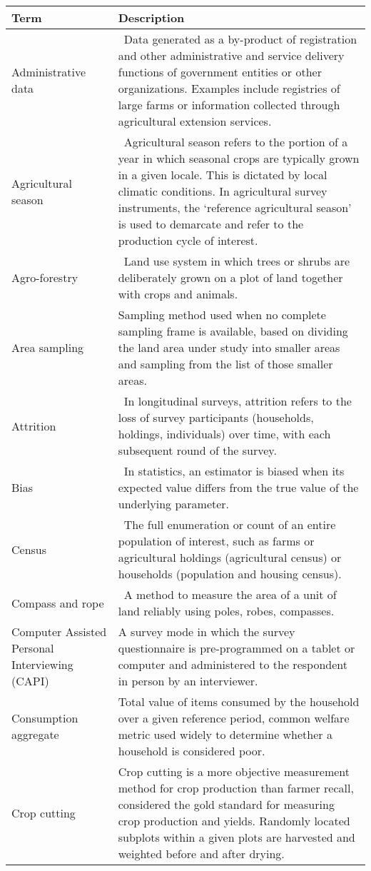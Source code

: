 \documentclass[
]{book}
\begin{document}
\begin{longtable}[]{@{}ll@{}}
\toprule
\textbf{Term} & \textbf{Description} \\
\midrule
\endhead
Administrative data & ~Data generated as a by-product of registration and other administrative and service delivery functions of government entities or other organizations. Examples include registries of large farms or information collected through agricultural extension services. \\
Agricultural season & ~Agricultural season refers to the portion of a year in which seasonal crops are typically grown in a given locale. This is dictated by local climatic conditions. In agricultural survey instruments, the `reference agricultural season' is used to demarcate and refer to the production cycle of interest. \\
Agro-forestry & ~Land use system in which trees or shrubs are deliberately grown on a plot of land together with crops and animals. \\
Area sampling & Sampling method used when no complete sampling frame is available, based on dividing the land area under study into smaller areas and sampling from the list of those smaller areas. \\
Attrition & ~In longitudinal surveys, attrition refers to the loss of survey participants (households, holdings, individuals) over time, with each subsequent round of the survey. \\
Bias & ~In statistics, an estimator is biased when its expected value differs from the true value of the underlying parameter. \\
Census & ~The full enumeration or count of an entire population of interest, such as farms or agricultural holdings (agricultural census) or households (population and housing census). \\
Compass and rope & ~A method to measure the area of a unit of land reliably using poles, robes, compasses. \\
Computer Assisted Personal Interviewing (CAPI) & A survey mode in which the survey questionnaire is pre-programmed on a tablet or computer and administered to the respondent in person by an interviewer. \\
Consumption aggregate & Total value of items consumed by the household over a given reference period, common welfare metric used widely to determine whether a household is considered poor. \\
Crop cutting & Crop cutting is a more objective measurement method for crop production than farmer recall, considered the gold standard for measuring crop production and yields. Randomly located subplots within a given plots are harvested and weighted before and after drying. \\

\end{longtable}
\end{document}
